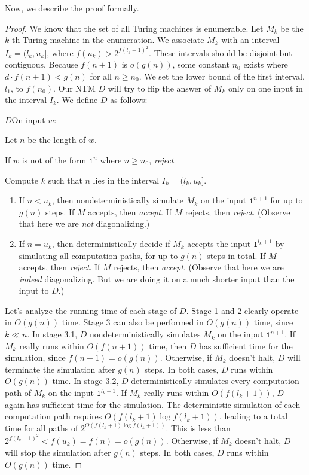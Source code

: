 \documentclass[11pt,twoside=off,numbers=noenddot]{scrbook}
\begin{document}
Now, we describe the proof formally.

\begin{proof}
  We know that the set of all Turing machines is enumerable. Let $M_k$ be the $k$-th Turing machine in the enumeration. We associate $M_k$ with an interval $I_k = (l_k, u_k]$, where $f(u_k) > 2^{f(l_k + 1)^2}$. These intervals should be disjoint but contiguous. Because $f(n + 1)$ is $o(g(n))$, some constant $n_0$ exists where $d \cdot f(n + 1) < g(n)$ for all $n \geq n_0$. We set the lower bound of the first interval, $l_1$, to $f(n_0)$. Our NTM $D$ will try to flip the answer of $M_k$ only on one input in the interval $I_k$. We define $D$ as follows:

  \begin{turing}{$D$}{On input $w$:}
  \item Let $n$ be the length of $w$.
  \item If $w$ is not of the form $\texttt{1}^n$ where $n \geq n_0$, \emph{reject}.
  \item Compute $k$ such that $n$ lies in the interval $I_k = (l_k, u_k]$.
    \begin{enumerate}[label=\theenumi.\arabic*.]
      \item If $n < u_k$, then nondeterministically simulate $M_k$ on the input $\texttt{1}^{n + 1}$ for up to $g(n)$ steps. If $M$ accepts, then \emph{accept}. If $M$ rejects, then \emph{reject}. (Observe that here we are \emph{not} diagonalizing.)
      \item If $n = u_k$, then deterministically decide if $M_k$ accepts the input $\texttt{1}^{l_k + 1}$ by simulating all computation paths, for up to $g(n)$ steps in total. If $M$ accepts, then \emph{reject}. If $M$ rejects, then \emph{accept}. (Observe that here we are \emph{indeed} diagonalizing. But we are doing it on a much shorter input than the input to $D$.)
    \end{enumerate}
  \end{turing}

  Let's analyze the running time of each stage of $D$. Stage 1 and 2 clearly operate in $O(g(n))$ time. Stage 3 can also be performed in $O(g(n))$ time, since $k \ll n$. In stage 3.1, $D$ nondeterministically simulates $M_k$ on the input $\texttt{1}^{n + 1}$. If $M_k$ really runs within $O(f(n + 1))$ time, then $D$ has sufficient time for the simulation, since $f(n + 1) = o(g(n))$. Otherwise, if $M_k$ doesn't halt, $D$ will terminate the simulation after $g(n)$ steps. In both cases, $D$ runs within $O(g(n))$ time. In stage 3.2, $D$ deterministically simulates every computation path of $M_k$ on the input $\texttt{1}^{l_k + 1}$. If $M_k$ really runs within $O(f(l_k + 1))$, $D$ again has sufficient time for the simulation. The deterministic simulation of each computation path requires $O(f(l_k + 1) \log f(l_k + 1))$, leading to a total time for all paths of $2^{O(f(l_k + 1) \log f(l_k + 1))}$. This is less than $2^{f(l_k + 1)^2} < f(u_k) = f(n) = o(g(n))$. Otherwise, if $M_k$ doesn't halt, $D$ will stop the simulation after $g(n)$ steps. In both cases, $D$ runs within $O(g(n))$ time.


\end{proof}
\end{document}
